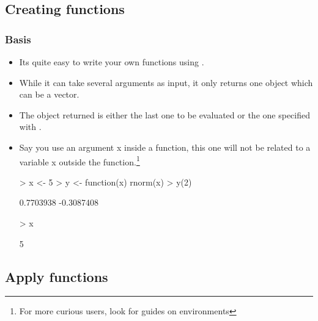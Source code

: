 \subsection{Creating functions}

\begin{frame}
  \frametitle{Basis}
  \begin{itemize}
  \item Its quite easy to write your own  functions using .
  \item While it can take several arguments as input, it only returns \alert{one} object which can be a vector.
  \item The object returned is either the last one to be evaluated or the one specified with . 
  \item Say you use an argument x inside a function, this one will not be related to a variable x outside the function.\footnote{For more curious users, look for guides on environments}
\begin{Schunk}
\begin{Sinput}
> x <- 5
> y <- function(x) rnorm(x)
> y(2)
\end{Sinput}
\begin{Soutput}
[1]  0.7703938 -0.3087408
\end{Soutput}
\begin{Sinput}
> x
\end{Sinput}
\begin{Soutput}
[1] 5
\end{Soutput}
\end{Schunk}
  \end{itemize}
\end{frame}

\subsection{Apply functions}

